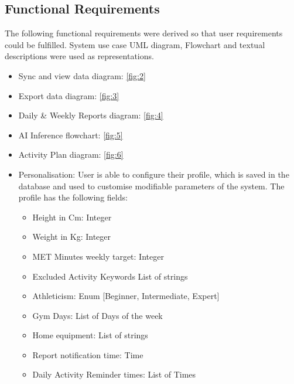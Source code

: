 \subsection{Functional Requirements}
The following functional requirements were derived so that user requirements could be fulfilled. System use case UML diagram, Flowchart and textual descriptions were used as representations.
\begin{itemize}
    \item Sync and view data diagram: \ref{fig:2}
    \item Export data diagram: \ref{fig:3}
    \item Daily \& Weekly Reports diagram: \ref{fig:4}
    \item AI Inference flowchart: \ref{fig:5}
    \item Activity Plan diagram: \ref{fig:6}
    \item Personalisation: User is able to configure their profile, which is saved in the database and used to customise modifiable parameters of the system. The profile has the following fields: 
    \begin{itemize}
        \item Height in Cm: Integer
        \item Weight in Kg: Integer
        \item MET Minutes weekly target: Integer
        \item Excluded Activity Keywords List of strings
        \item Athleticism: Enum [Beginner, Intermediate, Expert]
        \item Gym Days: List of Days of the week
        \item Home equipment: List of strings
        \item Report notification time: Time
        \item Daily Activity Reminder times: List of Times
    \end{itemize}
\end{itemize}

